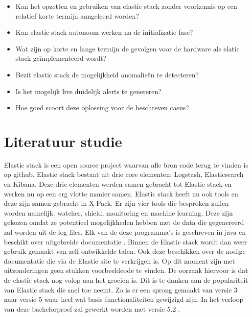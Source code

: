 \begin{itemize}
	\item Kan het opzetten en gebruiken van elastic stack zonder voorkennis op een relatief korte termijn aangeleerd worden?

	\item Kan elastic stack autonoom werken na de initializatie fase?
    
    \item Wat zijn op korte en lange termijn de gevolgen voor de hardware als elatic stack geïmplementeerd wordt?

	\item Bezit elastic stack de mogelijkheid anomalieën te detecteren?
    
    \item Is het mogelijk live duidelijk alerts te genereren? 

	\item Hoe goed scoort deze oplossing voor de beschreven casus?
\end{itemize}


\section{Literatuur studie}
\label{sec:literatuur-studie}

Elastic stack is een open source project waarvan alle bron code terug te vinden is op github. 
Elastic stack bestaat uit drie core elementen: Logstash, Elasticsearch en Kibana. Deze drie elementen werden samen gebracht tot Elastic stack en werken nu op een erg vlotte manier samen. Elastic stack heeft nu ook tools en deze zijn samen gebracht in X-Pack. Er zijn vier tools die besproken zullen worden namelijk: watcher, shield, monitoring en machine learning. Deze zijn gekozen omdat ze potentieel mogelijkheden hebben met de data die gegenereerd zal worden uit de log files.
Elk van de deze programma's is geschreven in java en beschikt over uitgebreide documentatie \autocite{documentatiesite}. Binnen de Elastic stack wordt dan weer gebruik gemaakt van zelf ontwikkelde talen. Ook deze beschikken over de nodige documentatie die via de Elastic site te verkrijgen is. 
Op dit moment zijn met uitzonderingen geen stukken voorbeeldcode te vinden. De oorzaak hiervoor is dat de elastic stack nog volop aan het groeien is. Dit is te danken aan de populariteit van Elastic stack die snel toe neemt. Zo is er een sprong gemaakt van versie 3 naar versie 5 waar heel wat basis functionaliteiten gewijzigd zijn. In het verloop van deze bachelorproef zal gewerkt worden met versie 5.2 .

